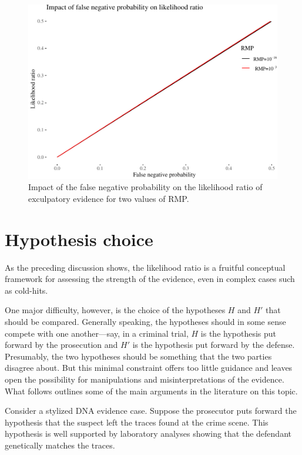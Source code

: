 \documentclass[10pt,dvipsnames,enabledeprecatedfontcommands]{scrartcl}
\begin{document}
\begin{figure}

\begin{center}\includegraphics[width=1\linewidth]{lr-chapter3_files/figure-latex/fig-fnplr-1} \end{center}
\label{fig:fnplr}
\caption{Impact of the false negative probability on the likelihood ratio of exculpatory evidence for two values of RMP.}
\end{figure}

\section{\texorpdfstring{Hypothesis choice
\label{sec:hchoice}}{Hypothesis choice }}\label{hypothesis-choice}

As the preceding discussion shows, the likelihood ratio is a fruitful
conceptual framework for assessing the strength of the evidence, even in
complex cases such as cold-hits.

One major difficulty, however, is the choice of the hypotheses \(H\) and
\(H'\) that should be compared. Generally speaking, the hypotheses
should in some sense compete with one another---say, in a criminal
trial, \(H\) is the hypothesis put forward by the prosecution and \(H'\)
is the hypothesis put forward by the defense. Presumably, the two
hypotheses should be something that the two parties disagree about. But
this minimal constraint offers too little guidance and leaves open the
possibility for manipulations and misinterpretations of the evidence.
What follows outlines some of the main arguments in the literature on
this topic.

Consider a stylized DNA evidence case. Suppose the prosecutor puts
forward the hypothesis that the suspect left the traces found at the
crime scene. This hypothesis is well supported by laboratory analyses
showing that the defendant genetically matches the traces.
\end{document}
